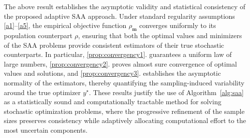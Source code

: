 \documentclass[letter,11pt, reqno]{amsart}
\renewcommand{\;}{\quad}
\theoremstyle{thmstyleone}%
\theoremstyle{thmstyletwo}%
\theoremstyle{thmstylethree}%
\begin{document}
The above result establishes the asymptotic validity and statistical consistency of the proposed adaptive SAA approach. 
Under standard regularity assumptions \ref{a1}--\ref{a5}, the empirical objective function $\rho_{\mathbf{m}}$ converges uniformly to its population counterpart $\rho$, ensuring that both the optimal values and minimizers of the SAA problems provide consistent estimators of their true stochastic counterparts. 
In particular, \ref{prop:convergency1}. guarantees a uniform law of large numbers, \ref{prop:convergency2}. proves almost sure convergence of optimal values and solutions, and \ref{prop:convergency3}. establishes the asymptotic normality of the estimators, thereby quantifying the sampling-induced variability around the true optimizer $y^\star$. 
These results justify the use of Algorithm~\ref{alg:saa} as a statistically sound and computationally tractable method for solving stochastic optimization problems, where the progressive refinement of the sample sizes preserves consistency while adaptively allocating computational effort to the most uncertain components.
\end{document}
